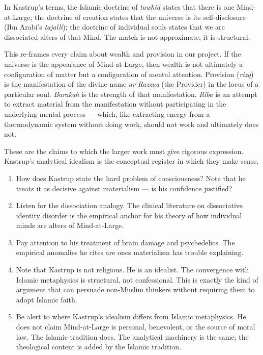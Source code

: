 \documentclass[11pt,a4paper]{book}
\theoremstyle{cleanrm}
\begin{document}
In Kastrup's terms, the Islamic doctrine of \emph{tawhid} states that
there is one Mind-at-Large; the doctrine of creation states that the
universe is its self-disclosure (Ibn Arabi's \emph{tajalli}); the
doctrine of individual souls states that we are dissociated alters of
that Mind. The match is not approximate; it is structural.

This re-frames every claim about wealth and provision in our project.
If the universe is the appearance of Mind-at-Large, then wealth is
not ultimately a configuration of matter but a configuration of mental
attention. Provision (\emph{rizq}) is the manifestation of the divine
name \emph{ar-Razzaq} (the Provider) in the locus of a particular soul.
\emph{Barakah} is the strength of that manifestation. \emph{Riba} is
an attempt to extract material from the manifestation without
participating in the underlying mental process --- which, like
extracting energy from a thermodynamic system without doing work,
should not work and ultimately does not.

These are the claims to which the larger work must give rigorous
expression. Kastrup's analytical idealism is the conceptual register
in which they make sense.

\begin{watchbox}
\begin{enumerate}[leftmargin=2em]
    \item How does Kastrup state the hard problem of consciousness?
    Note that he treats it as decisive against materialism --- is
    his confidence justified?
    \item Listen for the dissociation analogy. The clinical literature
    on dissociative identity disorder is the empirical anchor for
    his theory of how individual minds are alters of Mind-at-Large.
    \item Pay attention to his treatment of brain damage and
    psychedelics. The empirical anomalies he cites are ones
    materialism has trouble explaining.
    \item Note that Kastrup is not religious. He is an idealist.
    The convergence with Islamic metaphysics is structural, not
    confessional. This is exactly the kind of argument that can
    persuade non-Muslim thinkers without requiring them to adopt
    Islamic faith.
    \item Be alert to where Kastrup's idealism differs from Islamic
    metaphysics. He does not claim Mind-at-Large is personal,
    benevolent, or the source of moral law. The Islamic tradition
    does. The analytical machinery is the same; the theological
    content is added by the Islamic tradition.
\end{enumerate}
\end{watchbox}
\end{document}
